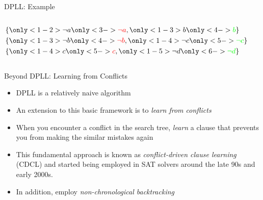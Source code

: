 \documentclass{beamer}
\begin{document}
\begin{frame}{DPLL: Example}
    \begin{columns}
        \begin{column}{0.45\textwidth}
            \begin{align*}
                &\{\only<1-2>{\neg a}\only<3->{\red{\neg a}},
                   \only<1-3>{b}\only<4->{\green{b}}\}\\
                &\{\only<1-3>{\neg b}\only<4->{\red{\neg b}},
                   \only<1-4>{\neg c}\only<5->{\green{\neg c}}\} \\
                &\{\only<1-4>{c}\only<5->{\red{c}},
                   \only<1-5>{\neg d}\only<6->{\green{\neg d}}\}\\
            \end{align*}
        \end{column}

        \begin{column}{0.45\textwidth}
            
        \end{column}
    \end{columns}
\end{frame}

\begin{frame}{Beyond DPLL: Learning from Conflicts}
    \begin{itemize}[<+->]
        \item DPLL is a relatively naive algorithm
        \item An extension to this basic framework is to \textit{learn from conflicts} 
        \item When you encounter a conflict in the search tree, \textit{learn} a clause that prevents you from making the similar mistakes again
        \item This fundamental approach is known as \textit{conflict-driven clause learning} (CDCL) and started being employed in SAT solvers around the late 90s and early 2000s.
        \item In addition, employ \textit{non-chronological backtracking}
    \end{itemize}
\end{frame}
\end{document}
